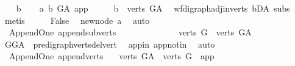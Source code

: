 \begin{isabellebody}
\ \ \isamarkupfalse%
\ b\isanewline
\ \ \isamarkupfalse%
\ a{}{\isacharcolon}{\kern0pt}\ {\isachardoublequoteopen}b\ {\isasymrightarrow}\isactrlbsub G{\isacharunderscore}{\kern0pt}A\isactrlesub \ app{\isachardoublequoteclose}\isanewline
\ \ \isamarkupfalse%
\ \isamarkupfalse%
\ {\isachardoublequoteopen}b\ {\isasymin}\ verts\ G{\isacharunderscore}{\kern0pt}A{\isachardoublequoteclose}\ \isamarkupfalse%
\ wf{\isacharunderscore}{\kern0pt}digraph{\isachardot}{\kern0pt}adj{\isacharunderscore}{\kern0pt}in{\isacharunderscore}{\kern0pt}verts{\isacharparenleft}{\kern0pt}{}{\isacharparenright}{\kern0pt}\ bD{\isacharunderscore}{\kern0pt}A\ subs\ \isamarkupfalse%
\ metis\isanewline
\ \ \isamarkupfalse%
\ \isamarkupfalse%
\ {\isachardoublequoteopen}False{\isachardoublequoteclose}\ \isamarkupfalse%
\ new{\isacharunderscore}{\kern0pt}node\ a{}\ \isamarkupfalse%
\ auto\isanewline
{}\isamarkupfalse%
%
\endisatagproof
{\isafoldproof}%
%
\isadelimproof
\isanewline
%
\endisadelimproof
\isanewline
\ \ \isanewline
{}\isamarkupfalse%
\ {\isacharparenleft}{\kern0pt}\ Append{\isacharunderscore}{\kern0pt}One{\isacharparenright}{\kern0pt}\ append{\isacharunderscore}{\kern0pt}subverts{\isacharcolon}{\kern0pt}\ \ \ \ \ \ \ \ \ \ \ \ \isanewline
\ \ {\isachardoublequoteopen}verts\ G\ {\isasymsubset}\ verts\ G{\isacharunderscore}{\kern0pt}A{\isachardoublequoteclose}\isanewline
%
\isadelimproof
\ \ %
\endisadelimproof
%
\isatagproof
{}\isamarkupfalse%
\ GG{\isacharunderscore}{\kern0pt}A\ \ pre{\isacharunderscore}{\kern0pt}digraph{\isachardot}{\kern0pt}verts{\isacharunderscore}{\kern0pt}del{\isacharunderscore}{\kern0pt}vert\ \isamarkupfalse%
\ app{\isacharunderscore}{\kern0pt}in\ app{\isacharunderscore}{\kern0pt}notin\ \isamarkupfalse%
\ auto%
\endisatagproof
{\isafoldproof}%
%
\isadelimproof
\isanewline
%
\endisadelimproof
\isanewline
{}\isamarkupfalse%
\ {\isacharparenleft}{\kern0pt}\ Append{\isacharunderscore}{\kern0pt}One{\isacharparenright}{\kern0pt}\ append{\isacharunderscore}{\kern0pt}verts{\isacharcolon}{\kern0pt}\ \isanewline
\ \ {\isachardoublequoteopen}verts\ G{\isacharunderscore}{\kern0pt}A\ {\isacharequal}{\kern0pt}\ verts\ G\ {\isasymunion}\ {\isacharbraceleft}{\kern0pt}app{\isacharbraceright}{\kern0pt}{\isachardoublequoteclose}\isanewline
%
\isadelimproof

\end{isabellebody}
